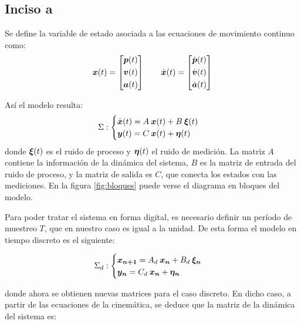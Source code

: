 \subsection{Inciso a}
	Se define la variable de estado asociada a las ecuaciones de movimiento continuo como:
		\begin{equation*}
			\vect{x}(t) = \begin{bmatrix} \vect{p}(t) \\[0.3em] \vect{v}(t) \\[0.3em] \vect{a}(t) \end{bmatrix} \qquad%
			\dot{\vect{x}}(t) = \begin{bmatrix} \dot{\vect{p}}(t) \\[0.3em] \dot{\vect{v}}(t) \\[0.3em] \dot{\vect{a}}(t) \end{bmatrix}
		\end{equation*}

	Así el modelo resulta:
		\begin{equation*}
			\Sigma:
			\begin{cases}
				\dot{\boldsymbol{x}}(t) = A\: \boldsymbol{x}(t) + B \: \boldsymbol{\xi}(t) \\
				\boldsymbol{y}(t) = C\: \boldsymbol{x}(t) + \boldsymbol{\eta}(t)
			\end{cases}
		\end{equation*}
	donde $\boldsymbol{\xi}(t)$ es el ruido de proceso y $\boldsymbol{\eta}(t)$ el ruido de medición. La matriz $A$ contiene la información de la dinámica del sistema, $B$ es la matriz de entrada del ruido de proceso, y la matriz de salida es $C$, que conecta los estados con las mediciones. En la figura \ref{fig:bloques} puede verse el diagrama en bloques del modelo.
	
	Para poder tratar el sistema en forma digital, es necesario definir un período de muestreo $T$, que en nuestro caso es igual a la unidad. De esta forma el modelo en tiempo discreto es el siguiente:
	
		\begin{equation*}
			\Sigma_{d}:
			\begin{cases}
				\boldsymbol{x_{n + 1}} = A_{d}\: \boldsymbol{x_{n}} + B_{d} \: \boldsymbol{\xi_{n}} \\
				\boldsymbol{y_{n}} = C_{d}\: \boldsymbol{x_{n}} + \boldsymbol{\eta_{n}}
			\end{cases}
		\end{equation*}
		
	donde ahora se obtienen nuevas matrices para el caso discreto. En dicho caso, a partir de las ecuaciones de la cinemática, se deduce que la matriz de la dinámica del sistema es:

